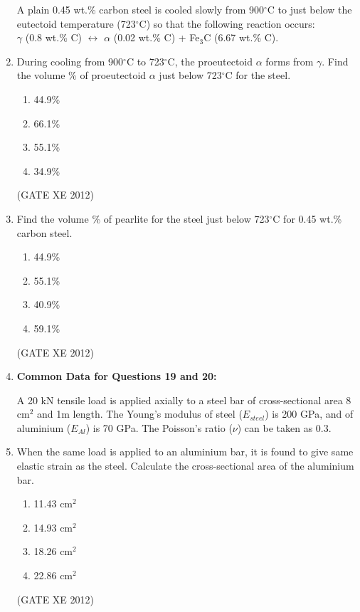 \documentclass[12pt]{article}
\begin{document}
\begin{enumerate}
  A plain 0.45 wt.\% carbon steel is cooled slowly from 900$^\circ$C to just below the eutectoid temperature (723$^\circ$C) so that the following reaction occurs: \\
  $\gamma$ (0.8 wt.\% C) $\leftrightarrow$ $\alpha$ (0.02 wt.\% C) + Fe$_3$C (6.67 wt.\% C).

  \item During cooling from 900$^\circ$C to 723$^\circ$C, the proeutectoid $\alpha$ forms from $\gamma$. Find the volume \% of proeutectoid $\alpha$ just below 723$^\circ$C for the steel.
  \begin{multicols}{4}
    \begin{enumerate}
      \item 44.9\%
      \item 66.1\%
      \item 55.1\%
      \item 34.9\%
    \end{enumerate}
  \end{multicols}
  (GATE XE 2012)

  \item Find the volume \% of pearlite for the steel just below 723$^\circ$C for 0.45 wt.\% carbon steel.
  \begin{multicols}{4}
    \begin{enumerate}
      \item 44.9\%
      \item 55.1\%
      \item 40.9\%
      \item 59.1\%
    \end{enumerate}
  \end{multicols}
  (GATE XE 2012)

  \item[] \textbf{Common Data for Questions 19 and 20:} 
  
  A 20 kN tensile load is applied axially to a steel bar of cross-sectional area 8 cm$^2$ and 1m length. The Young’s modulus of steel ($E_{steel}$) is 200 GPa, and of aluminium ($E_{Al}$) is 70 GPa. The Poisson’s ratio ($\nu$) can be taken as 0.3.

  \item When the same load is applied to an aluminium bar, it is found to give same elastic strain as the steel. Calculate the cross-sectional area of the aluminium bar.
  \begin{multicols}{4}
    \begin{enumerate}
      \item 11.43 cm$^2$
      \item 14.93 cm$^2$
      \item 18.26 cm$^2$
      \item 22.86 cm$^2$
    \end{enumerate}
  \end{multicols}
  (GATE XE 2012)


\end{enumerate}
\end{document}
